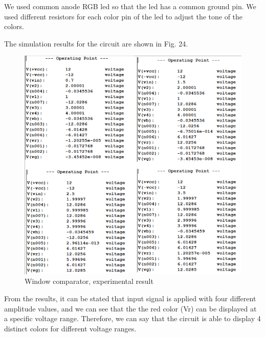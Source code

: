 \documentclass[conference]{IEEEtran}
\begin{document}
\par We used common anode RGB led so that the led has a common ground pin. We used different resistors for each color pin of the led 
to adjust the tone of the colors. 

\par The simulation results for the circuit are shown in Fig. 24. 
\begin{figure}[H]
    \centerline{\includegraphics[scale=0.4]{wcr.png}}
     \caption{Window comparator, experimental result}
 \end{figure} 
\par From the results, it can be stated that input signal is applied with four different amplitude values, and we can see that the the red color (Vr) can be displayed at a specific voltage range. Therefore, we can say that the circuit is able to display 4 distinct colors for different voltage ranges. 
\end{document}
